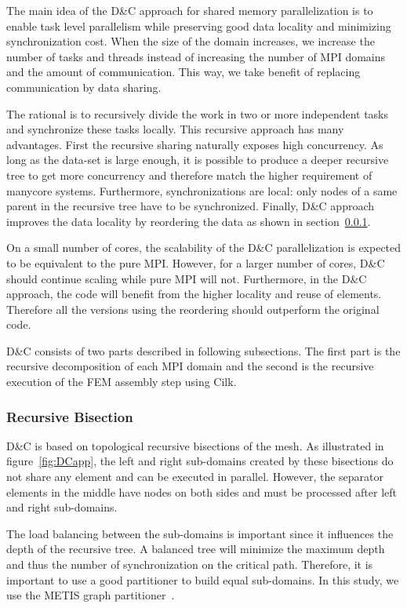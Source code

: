 \documentclass[10pt]{IOS-Book-Article}
\begin{document}
The main idea of the D\&C approach for shared memory parallelization is to enable task level parallelism while preserving good data locality and minimizing synchronization cost.
When the size of the domain increases, we increase the number of tasks and threads instead of increasing the number of MPI domains and the amount of communication.
This way, we take benefit of replacing communication by data sharing.

The rational is to  recursively divide the work in two or more independent tasks and synchronize these tasks locally. This recursive approach has many advantages.
First the recursive sharing naturally exposes high concurrency. As long as the data-set is large enough, it is possible to produce a deeper recursive tree to get more concurrency and 
therefore match the higher requirement of manycore systems. Furthermore, synchronizations are local: only nodes of a same parent in the recursive tree have to be synchronized.
Finally, D\&C approach improves the data locality by reordering the data as shown in section~\ref{sec:DCrec}.

On a small number of cores, the scalability of the D\&C parallelization is expected to be equivalent to the pure MPI.
However, for a larger number of cores, D\&C should continue scaling while pure MPI will not.
Furthermore, in the D\&C approach, the code will benefit from the higher locality and reuse of elements. Therefore all the versions using the reordering should outperform the original code.

D\&C consists of two parts described in following subsections.
The first part is the recursive decomposition of each MPI domain and the second is the recursive execution of the FEM assembly step using Cilk.

\subsubsection{Recursive Bisection}
\label{sec:DCrec}
D\&C is based on topological recursive bisections of the mesh.
As illustrated in figure~\ref{fig:DCapp}, the left and right sub-domains created by these bisections do not share any element and can be executed in parallel.
However, the separator elements in the middle have nodes on both sides and must be processed after left and right sub-domains.

The load balancing between the sub-domains is important since it influences the depth of the recursive tree.
A balanced tree will minimize the maximum depth and thus the number of synchronization on the critical path.
Therefore, it is important to use a good partitioner to build equal sub-domains. In this study, we use the METIS graph partitioner~\cite{Metis}.
\end{document}
